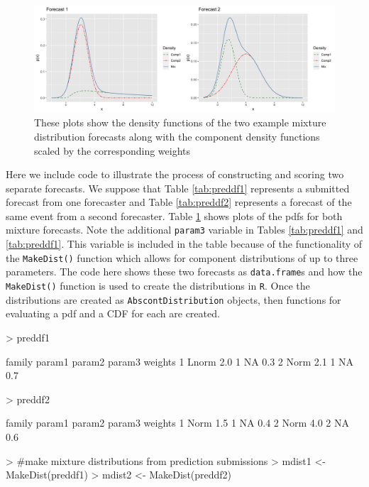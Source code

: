 \documentclass[11pt,notitlepage]{isuthesis}
\begin{document}
\begin{figure}[htbp]
\centerline{\includegraphics[scale=.15]{Images/toyfors12.png}}
\begin{center}
 \begin{minipage}{11cm}
\captionsetup{font=scriptsize}
\caption[Example mixture distributions]{These plots show the density functions 
of
the two example mixture distribution forecasts along with the component density
functions scaled by the corresponding weights}
\label{fig:toymixs}
\end{minipage}
\end{center}
\end{figure}

Here we include code to illustrate the process of constructing and scoring two 
separate forecasts. We suppose that Table \ref{tab:preddf1} represents a 
submitted forecast from one forecaster and Table \ref{tab:preddf2} represents
a forecast of the same event from a second forecaster. Table \ref{fig:toymixs}
shows plots of the pdfs for both mixture forecasts.
Note the additional \texttt{param3} variable
in Tables \ref{tab:preddf1} and \ref{tab:preddf1}. This variable is included
in the table because of the functionality of the \texttt{MakeDist()} function
which allows for component distributions of up to three parameters.
The code here shows these two forecasts as \texttt{data.frame}s and how the 
\texttt{MakeDist()} 
function is used to create the distributions in \texttt{R}. Once the 
distributions are created as \texttt{AbscontDistribution} objects, then 
functions for evaluating a pdf and a CDF for each are created.







\begin{Schunk}
\begin{Sinput}
> preddf1
\end{Sinput}
\begin{Soutput}
  family param1 param2 param3 weights
1  Lnorm    2.0      1     NA     0.3
2   Norm    2.1      1     NA     0.7
\end{Soutput}
\begin{Sinput}
> preddf2
\end{Sinput}
\begin{Soutput}
  family param1 param2 param3 weights
1   Norm    1.5      1     NA     0.4
2   Norm    4.0      2     NA     0.6
\end{Soutput}
\begin{Sinput}
> #make mixture distributions from prediction submissions
> mdist1 <- MakeDist(preddf1)
> mdist2 <- MakeDist(preddf2)
\end{Sinput}
\end{Schunk}
\end{document}
